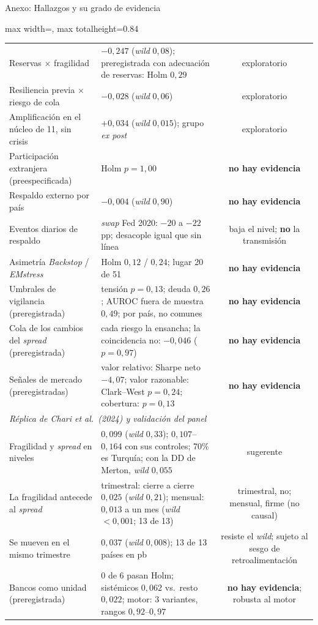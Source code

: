 \documentclass[aspectratio=169]{beamer}
\begin{document}
\begin{frame}{Anexo: Hallazgos y su grado de evidencia}
\begin{adjustbox}{max width=\textwidth, max totalheight=0.84\textheight}
\begin{tabular}{llc}
Reservas $\times$ fragilidad & $-0{,}247$ (\textit{wild} $0{,}08$); preregistrada con adecuación de reservas: Holm $0{,}29$ & exploratorio \\
Resiliencia previa $\times$ riesgo de cola & $-0{,}028$ (\textit{wild} $0{,}06$) & exploratorio \\
Amplificación en el núcleo de 11, sin crisis & $+0{,}034$ (\textit{wild} $0{,}015$); grupo \textit{ex post} & exploratorio \\
Participación extranjera (preespecificada) & Holm $p=1{,}00$ & \textbf{no hay evidencia} \\
Respaldo externo por país & $-0{,}004$ (\textit{wild} $0{,}90$) & \textbf{no hay evidencia} \\
Eventos diarios de respaldo & \textit{swap} Fed 2020: $-20$ a $-22$ pp; desacople igual que sin línea & baja el nivel; \textbf{no} la transmisión \\
Asimetría \textit{Backstop} / \textit{EMstress} & Holm $0{,}12$ / $0{,}24$; lugar 20 de 51 & \textbf{no hay evidencia} \\
Umbrales de vigilancia (preregistrada) & tensión $p=0{,}13$; deuda $0{,}26$; AUROC fuera de muestra $0{,}49$; por país, no comunes & \textbf{no hay evidencia} \\
Cola de los cambios del \textit{spread} (preregistrada) & cada riesgo la ensancha; la coincidencia no: $-0{,}046$ ($p=0{,}97$) & \textbf{no hay evidencia} \\
Señales de mercado (preregistradas) & valor relativo: Sharpe neto $-4{,}07$; valor razonable: Clark--West $p=0{,}24$; cobertura: $p=0{,}13$ & \textbf{no hay evidencia} \\
\midrule
\multicolumn{3}{l}{\textit{Réplica de Chari et al.\ (2024) y validación del panel}} \\
Fragilidad y \textit{spread} en niveles & $0{,}099$ (\textit{wild} $0{,}33$); $0{,}107$--$0{,}164$ con sus controles; 70\% es Turquía; con la DD de Merton, \textit{wild} $0{,}055$ & sugerente \\
La fragilidad antecede al \textit{spread} & trimestral: cierre a cierre $0{,}025$ (\textit{wild} $0{,}21$); mensual: $0{,}013$ a un mes (\textit{wild} $<0{,}001$; 13 de 13) & trimestral, no; mensual, firme (no causal) \\
Se mueven en el mismo trimestre & $0{,}037$ (\textit{wild} $0{,}008$); 13 de 13 países en pb & resiste el \textit{wild}; sujeto al sesgo de retroalimentación \\
Bancos como unidad (preregistrada) & 0 de 6 pasan Holm; sistémicos $0{,}062$ vs.\ resto $0{,}022$; motor: 3 variantes, rangos $0{,}92$--$0{,}97$ & \textbf{no hay evidencia}; robusta al motor \\
\bottomrule
\end{tabular}
\end{adjustbox}
\end{frame}
\end{document}
